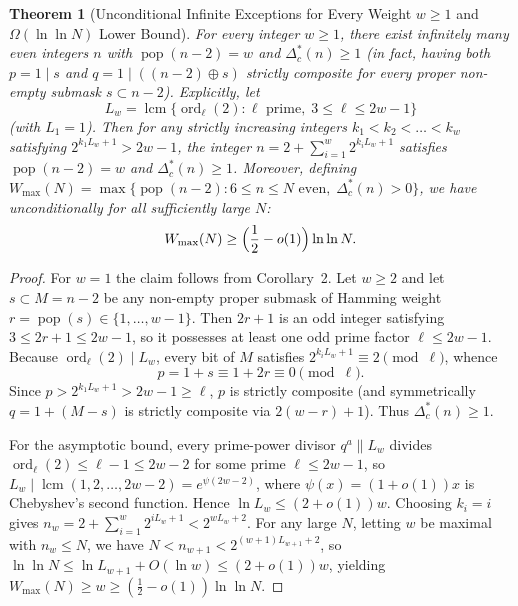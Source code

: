 \documentclass[11pt,a4paper]{article}
\newtheorem{theorem}{Theorem}
\begin{document}
\begin{theorem}[Unconditional Infinite Exceptions for Every Weight $w \ge 1$ and $\Omega(\ln \ln N)$ Lower Bound]
\label{thm:allw}
For every integer $w \ge 1$, there exist infinitely many even integers $n$ with $\operatorname{pop}(n - 2) = w$ and $\Delta_c^*(n) \ge 1$ (in fact, having \emph{both} $p = 1 \mathbin{|} s$ and $q = 1 \mathbin{|} ((n-2) \oplus s)$ strictly composite for every proper non-empty submask $s \subset n - 2$). Explicitly, let
\begin{equation}
L_w = \operatorname{lcm}\bigl\{\operatorname{ord}_\ell(2) : \ell \text{ prime},\; 3 \le \ell \le 2w - 1\bigr\}
\end{equation}
(with $L_1 = 1$). Then for any strictly increasing integers $k_1 < k_2 < \dots < k_w$ satisfying $2^{k_1 L_w + 1} > 2w - 1$, the integer $n = 2 + \sum_{i=1}^w 2^{k_i L_w + 1}$ satisfies $\operatorname{pop}(n - 2) = w$ and $\Delta_c^*(n) \ge 1$. Moreover, defining $W_{\max}(N) = \max\{\operatorname{pop}(n - 2) : 6 \le n \le N \text{ even},\; \Delta_c^*(n) > 0\}$, we have unconditionally for all sufficiently large $N$:
\begin{equation}
W_{\max}(N) \ge \Bigl(\frac{1}{2} - o(1)\Bigr) \ln \ln N.
\end{equation}
\end{theorem}

\begin{proof}
For $w = 1$ the claim follows from Corollary~2. Let $w \ge 2$ and let $s \subset M = n - 2$ be any non-empty proper submask of Hamming weight $r = \operatorname{pop}(s) \in \{1, \dots, w - 1\}$. Then $2r + 1$ is an odd integer satisfying $3 \le 2r + 1 \le 2w - 1$, so it possesses at least one odd prime factor $\ell \le 2w - 1$. Because $\operatorname{ord}_\ell(2) \mid L_w$, every bit of $M$ satisfies $2^{k_i L_w + 1} \equiv 2 \pmod \ell$, whence
\[
p = 1 + s \equiv 1 + 2r \equiv 0 \pmod \ell.
\]
Since $p > 2^{k_1 L_w + 1} > 2w - 1 \ge \ell$, $p$ is strictly composite (and symmetrically $q = 1 + (M - s)$ is strictly composite via $2(w - r) + 1$). Thus $\Delta_c^*(n) \ge 1$.

For the asymptotic bound, every prime-power divisor $q^a \parallel L_w$ divides $\operatorname{ord}_\ell(2) \le \ell - 1 \le 2w - 2$ for some prime $\ell \le 2w - 1$, so $L_w \mid \operatorname{lcm}(1, 2, \dots, 2w - 2) = e^{\psi(2w - 2)}$, where $\psi(x) = (1 + o(1))x$ is Chebyshev's second function. Hence $\ln L_w \le (2 + o(1))w$. Choosing $k_i = i$ gives $n_w = 2 + \sum_{i=1}^w 2^{i L_w + 1} < 2^{w L_w + 2}$. For any large $N$, letting $w$ be maximal with $n_w \le N$, we have $N < n_{w+1} < 2^{(w+1)L_{w+1} + 2}$, so $\ln \ln N \le \ln L_{w+1} + O(\ln w) \le (2 + o(1))w$, yielding $W_{\max}(N) \ge w \ge (\frac{1}{2} - o(1))\ln \ln N$.
\end{proof}
\end{document}
